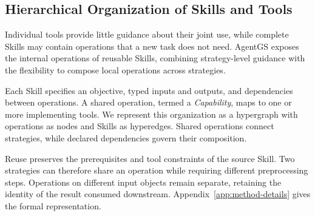 \subsection{Hierarchical Organization of Skills and Tools}
\label{sec:representation}
Individual tools provide little guidance about their joint use, while complete Skills may contain operations that a new task does not need. AgentGS exposes the internal operations of reusable Skills, combining strategy-level guidance with the flexibility to compose local operations across strategies.

Each Skill specifies an objective, typed inputs and outputs, and dependencies between operations. A shared operation, termed a \emph{Capability}, maps to one or more implementing tools. We represent this organization as a hypergraph with operations as nodes and Skills as hyperedges. Shared operations connect strategies, while declared dependencies govern their composition.

Reuse preserves the prerequisites and tool constraints of the source Skill. Two strategies can therefore share an operation while requiring different preprocessing steps. Operations on different input objects remain separate, retaining the identity of the result consumed downstream. Appendix~\ref{app:method-details} gives the formal representation.
